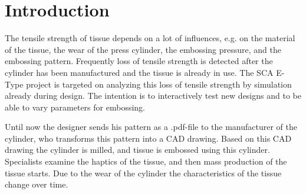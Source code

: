 



\chapter{Introduction}

The tensile strength of tissue depends on a lot of influences, e.g. on the material 
of the tissue, the wear of the press cylinder, the embossing pressure, and the 
embossing pattern. Frequently loss of tensile strength is detected after the cylinder 
has been manufactured and the tissue is already in use. The SCA E-Type project is 
targeted on analyzing this loss of tensile strength by simulation already during 
design. The intention is to interactively test new designs and to be able to vary 
parameters for embossing.

Until now the designer sends his pattern as a .pdf-file to the manufacturer of the 
cylinder, who transforms this pattern into a CAD drawing. Based on this CAD drawing 
the cylinder is milled, and tissue is embossed using this cylinder. Specialists examine 
the haptics of the tissue, and then mass production of the tissue starts. Due to the 
wear of the cylinder the characteristics of the tissue change over time.


